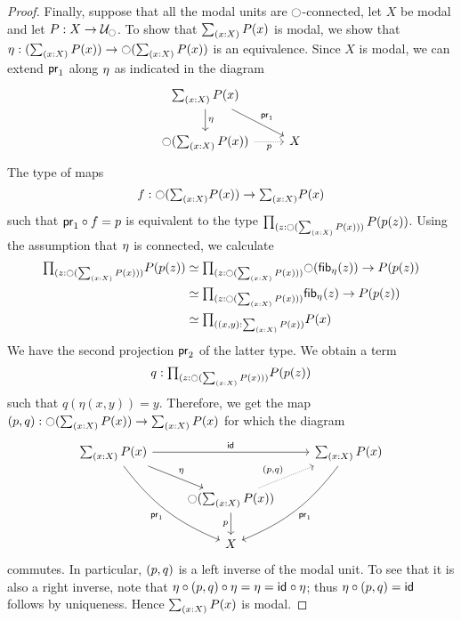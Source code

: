 \begin{proof}
Finally, suppose that all the modal units are ${\ocircle}$-connected, let $X$ be modal and let $P:X\to\mathcal{U}_{\ocircle}$.
To show that $\sm{x:X}P(x)$ is modal, we show that
$\modalunit:(\sm{x:X}P(x))\to\modal(\sm{x:X}P(x))$ is an equivalence.
Since $X$ is modal, we can extend $\mathsf{pr}_{1}$ along ${\eta_{}}$ as indicated
in the diagram
\begin{equation*}
\begin{tikzcd}
\sm{x:X}P(x) \arrow[d,"\modalunit"] \arrow[dr,"\proj 1"] \\
\modal(\sm{x:X}P(x)) \arrow[r,densely dotted,swap,"p"] & X
\end{tikzcd}
\end{equation*}
The type of maps
\begin{equation*}
f:\modal(\sm{x:X}P(x))\to \sm{x:X}P(x)
\end{equation*}
such that $\mathsf{pr}_{1}\circ f=p$ is equivalent to the type $\prd{z:\modal(\sm{x:X}P(x))}P(p(z))$.
Using the assumption that ${\eta_{}}$ is connected, we calculate
\begin{align*}
\prd{z:\modal(\sm{x:X}P(x))}P(p(z))
& \eqvsym \prd{z:\modal(\sm{x:X}P(x))} \modal(\fib{\modalunit}{z})\to P(p(z)) \\
& \eqvsym \prd{z:\modal(\sm{x:X}P(x))} \fib{\modalunit}{z}\to P(p(z)) \\
& \eqvsym \prd{\pairr{x,y}:\sm{x:X}P(x)} P(x)
\end{align*}
We have the second projection $\mathsf{pr}_{2}$ of the latter type. We obtain a term
\begin{equation*}
q : \prd{z:\modal(\sm{x:X}P(x))}P(p(z))
\end{equation*}
such that $q(\eta(x,y))=y$. Therefore, we get the map $\pairr{p,q}:\modal(\sm{x:X}P(x))\to \sm{x:X}P(x)$ for which the diagram
\begin{equation*}
\begin{tikzcd}
\sm{x:X}P(x) \arrow[dr,"\modalunit"] \arrow[ddr,bend right=15,swap,"\proj 1"] \arrow[rr,"\idfunc"] & & \sm{x:X}P(x) \arrow[ddl,bend left=15,"\proj 1"] \\
& \modal(\sm{x:X}P(x)) \arrow[d,swap,"p"] \arrow[ur,densely dotted,"\pairr{p,q}"] \\
& X
\end{tikzcd}
\end{equation*}
commutes. In particular, ${\mathopen{}(p,q)\mathclose{}}$ is a left inverse of the modal unit.
To see that it is also a right inverse, note that ${\eta_{}}\circ{\mathopen{}(p,q)\mathclose{}}\circ{\eta_{}}={\eta_{}}=\mathsf{id}_{}\circ{\eta_{}}$; thus ${\eta_{}}\circ{\mathopen{}(p,q)\mathclose{}}=\mathsf{id}_{}$ follows by uniqueness.
Hence $\sm{x:X}P(x)$ is modal.
\end{proof}

